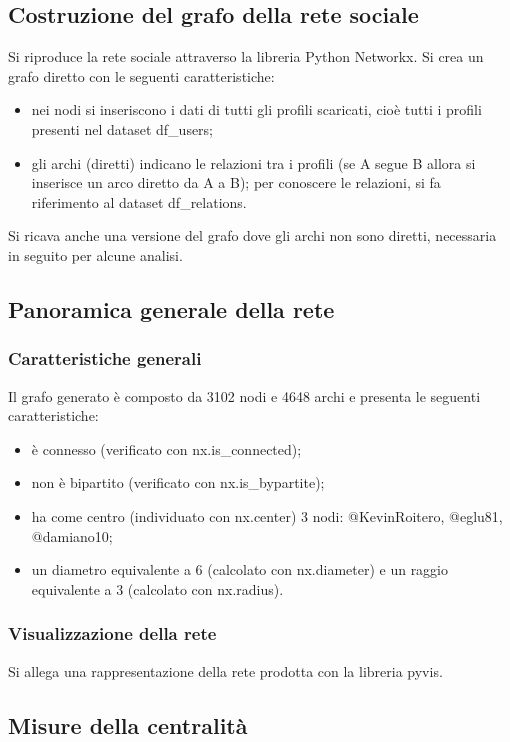\documentclass[a4paper, 12pt, twoside]{article}
\begin{document}
\subsection{Costruzione del grafo della rete sociale}
Si riproduce la rete sociale attraverso la libreria Python Networkx. Si crea un grafo diretto con le seguenti caratteristiche:
\begin{itemize}
    \item nei nodi si inseriscono i dati di tutti gli profili scaricati, cioè tutti i profili presenti nel dataset df\_users;
    \item gli archi (diretti) indicano le relazioni tra i profili (se A segue B allora si inserisce un arco diretto da A a B); per conoscere le relazioni, si fa riferimento al dataset df\_relations.
\end{itemize}
Si ricava anche una versione del grafo dove gli archi non sono diretti, necessaria in seguito per alcune analisi.


\subsection{Panoramica generale della rete}

\subsubsection{Caratteristiche generali}
Il grafo generato è composto da 3102 nodi e 4648 archi e presenta le seguenti caratteristiche:
\begin{itemize}
    \item è connesso (verificato con nx.is\_connected);
    \item non è bipartito (verificato con nx.is\_bypartite);
    \item ha come centro (individuato con nx.center) 3 nodi: @KevinRoitero, @eglu81, @damiano10;
    \item un diametro equivalente a 6 (calcolato con nx.diameter) e un raggio equivalente a 3 (calcolato con nx.radius).
\end{itemize}

\subsubsection{Visualizzazione della rete}
Si allega una rappresentazione della rete prodotta con la libreria pyvis.


\subsection{Misure della centralità}
\end{document}
